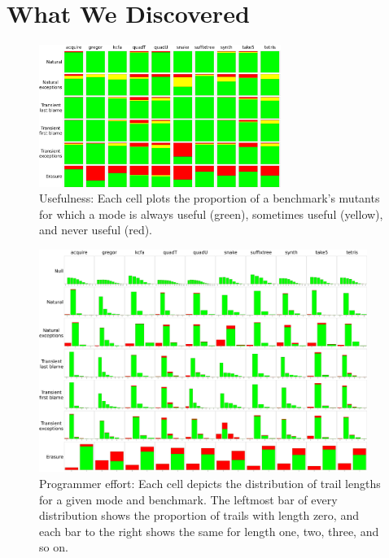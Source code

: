\section{What We Discovered}

\begin{figure}
  \centering
  \includegraphics[width=0.7\textwidth]{./plots/usefulness-table}
  \caption{Usefulness: Each cell plots the proportion of a benchmark's mutants for which a mode is always useful (green), sometimes useful (yellow), and never useful (red).}
  \label{fig:usefulness-table}
\end{figure}

\begin{figure}
  \centering
  \includegraphics[width=0.95\textwidth]{./plots/bt-lengths-table}
  \caption{Programmer effort: Each cell depicts the distribution of trail lengths for a given mode and benchmark. The leftmost bar of every distribution shows the proportion of trails with length zero, and each bar to the right shows the same for length one, two, three, and so on.}
  \label{fig:effort-table}
\end{figure}

